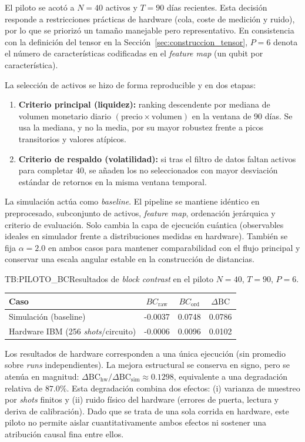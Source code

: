 El piloto se acotó a \(N=40\) activos y \(T=90\) días recientes. Esta decisión responde a restricciones prácticas de hardware (cola, coste de medición y ruido), por lo que se priorizó un tamaño manejable pero representativo. En consistencia con la definición del tensor en la Sección~\ref{sec:construccion_tensor}, \(P=6\) denota el número de características codificadas en el \textit{feature map} (un qubit por característica).

La selección de activos se hizo de forma reproducible y en dos etapas:
\begin{enumerate}
\item \textbf{Criterio principal (liquidez):} ranking descendente por mediana de volumen monetario diario \((\text{precio}\times\text{volumen})\) en la ventana de 90 días. Se usa la mediana, y no la media, por su mayor robustez frente a picos transitorios y valores atípicos.
\item \textbf{Criterio de respaldo (volatilidad):} si tras el filtro de datos faltan activos para completar 40, se añaden los no seleccionados con mayor desviación estándar de retornos en la misma ventana temporal.
\end{enumerate}

La simulación actúa como \textit{baseline}. El pipeline se mantiene idéntico en preprocesado, subconjunto de activos, \textit{feature map}, ordenación jerárquica y criterio de evaluación. Solo cambia la capa de ejecución cuántica (observables ideales en simulador frente a distribuciones medidas en hardware). También se fija \(\alpha=2.0\) en ambos casos para mantener comparabilidad con el flujo principal y conservar una escala angular estable en la construcción de distancias.

\begin{table}[Piloto hardware vs simulación]{TB:PILOTO_BC}{Resultados de \textit{block contrast} en el piloto \(N=40\), \(T=90\), \(P=6\).}
\begin{tabular}{lccc}
\hline
\textbf{Caso} & \textbf{$BC_{\mathrm{raw}}$} & \textbf{$BC_{\mathrm{ord}}$} & \textbf{$\Delta\mathrm{BC}$} \\
\hline
Simulación (baseline) & -0.0037 & 0.0748 & 0.0786 \\
Hardware IBM (256 \textit{shots}/circuito) & -0.0006 & 0.0096 & 0.0102 \\
\hline
\end{tabular}
\end{table}

Los resultados de hardware corresponden a una única ejecución (sin promedio sobre \textit{runs} independientes). La mejora estructural se conserva en signo, pero se atenúa en magnitud: \(\Delta\mathrm{BC}_{\text{hw}}/\Delta\mathrm{BC}_{\text{sim}}\approx 0.1298\), equivalente a una degradación relativa de \(87.0\%\). Esta degradación combina dos efectos: (i) varianza de muestreo por \textit{shots} finitos y (ii) ruido físico del hardware (errores de puerta, lectura y deriva de calibración). Dado que se trata de una sola corrida en hardware, este piloto no permite aislar cuantitativamente ambos efectos ni sostener una atribución causal fina entre ellos.

